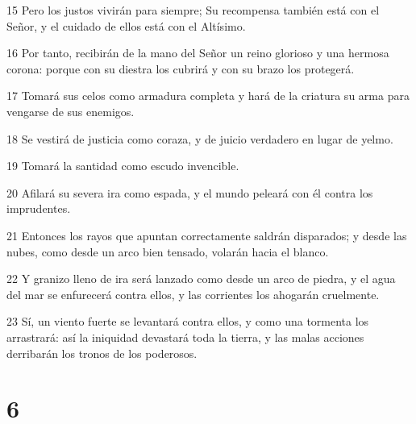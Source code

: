 \par 15 Pero los justos vivirán para siempre; Su recompensa también está con el Señor, y el cuidado de ellos está con el Altísimo.
\par 16 Por tanto, recibirán de la mano del Señor un reino glorioso y una hermosa corona: porque con su diestra los cubrirá y con su brazo los protegerá.
\par 17 Tomará sus celos como armadura completa y hará de la criatura su arma para vengarse de sus enemigos.
\par 18 Se vestirá de justicia como coraza, y de juicio verdadero en lugar de yelmo.
\par 19 Tomará la santidad como escudo invencible.
\par 20 Afilará su severa ira como espada, y el mundo peleará con él contra los imprudentes.
\par 21 Entonces los rayos que apuntan correctamente saldrán disparados; y desde las nubes, como desde un arco bien tensado, volarán hacia el blanco.
\par 22 Y granizo lleno de ira será lanzado como desde un arco de piedra, y el agua del mar se enfurecerá contra ellos, y las corrientes los ahogarán cruelmente.
\par 23 Sí, un viento fuerte se levantará contra ellos, y como una tormenta los arrastrará: así la iniquidad devastará toda la tierra, y las malas acciones derribarán los tronos de los poderosos.

\chapter{6}

